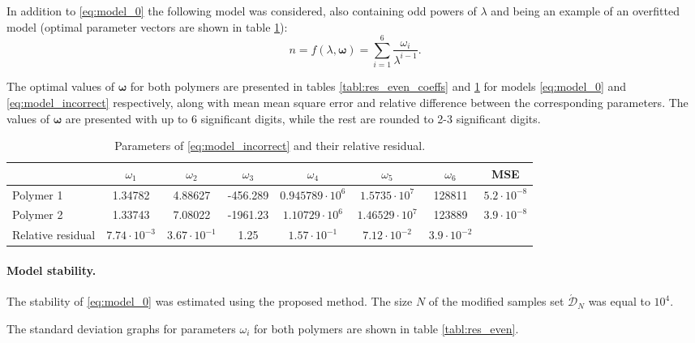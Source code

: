 \documentclass[11pt,a4paper]{article}
\theoremstyle{definition}
\begin{document}
In addition to \eqref{eq:model_0} the following model was considered, also containing
odd powers of $\lambda$ and being an example of an overfitted model (optimal parameter
vectors are shown in table \ref{tabl:res_all_coeffs}):
\begin{equation}
  n = f(\lambda, \boldsymbol{\omega}) = \sum_{i = 1}^6 \frac{\omega_i}{\lambda^{i - 1}}.
  \label{eq:model_incorrect}
\end{equation}

The optimal values of $\boldsymbol{\omega}$ for both polymers are presented in
tables \ref{tabl:res_even_coeffs} and \ref{tabl:res_all_coeffs} for models
\eqref{eq:model_0} and \eqref{eq:model_incorrect} respectively, along with mean
mean square error and relative difference between the corresponding parameters.
The values of $\boldsymbol{\omega}$ are presented with up to 6 significant
digits, while the rest are rounded to 2-3 significant digits.

\begin{table}[h]
  \centering
  \footnotesize
  \caption{Parameters of \eqref{eq:model_incorrect} and their relative residual.}
  \begin{tabular}{| l | c | c | c | c | c | c | c |} \hline
						& $\omega_1$			& $\omega_2$			& $\omega_3$			& $\omega_4$			& $\omega_5$			& $\omega_6$			& MSE					\\ \hline
	Polymer 1			& 1.34782				& 4.88627				& -456.289				& $0.945789 \cdot 10^6$	& $1.5735 \cdot 10^7$	& 128811				& $5.2 \cdot 10^{-8}$	\\ \hline
	Polymer 2			& 1.33743				& 7.08022				& -1961.23				& $1.10729 \cdot 10^6$	& $1.46529 \cdot 10^7$	& 123889				& $3.9 \cdot 10^{-8}$	\\ \hline
	Relative residual	& $7.74 \cdot 10^{-3}$	& $3.67 \cdot 10^{-1}$	& 1.25					& $1.57 \cdot 10^{-1}$	& $7.12 \cdot 10^{-2}$	& $3.9 \cdot 10^{-2}$	&						\\ \hline
  \end{tabular}
  \label{tabl:res_all_coeffs}
\end{table}

\paragraph{Model stability.}
The stability of \eqref{eq:model_0} was estimated using the proposed method.
The size $N$ of the modified samples set $\acute{\mathcal{D}}_N$ was equal to $10^4$.

The standard deviation graphs for parameters $\omega_i$ for both polymers are shown in
table \ref{tabl:res_even}.
\end{document}
